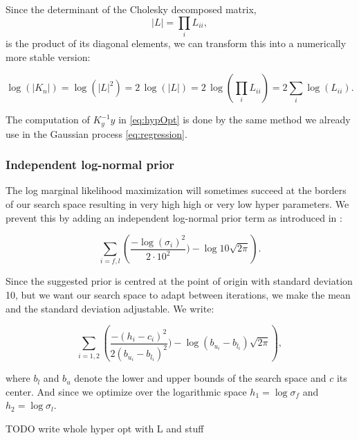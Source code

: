 Since the determinant of the Cholesky decomposed matrix,
$$|L| = \textstyle\prod_{i} L_{ii},$$
is the product of its diagonal elements, we can transform this into a numerically more stable version:

$$\log(|K_n|) = \log(|L|^{2}) = 2\,\log(|L|) = 2\,\log(\textstyle\prod_{i} L_{ii}) = 2\textstyle\sum_{i} \log(L_{ii}).$$

The computation of $K_y^{-1}y$ in \eqref{eq:hypOpt} is done by the same method we already use in the Gaussian process \eqref{eq:regression}.

\subsubsection{Independent log-normal prior}
The log marginal likelihood maximization will sometimes succeed at the borders of our search space resulting in very high high or very low hyper parameters. We prevent this by adding an independent log-normal prior term as introduced in \cite{lizotte2008practical}:

$$\sum_{i=f,l}\left(\frac{-\log(\sigma_i)^2}{2\cdot 10^2}) - \log 10\sqrt{2\pi} \right).$$

Since the suggested prior is centred at the point of origin with standard deviation 10, but we want our search space to adapt between iterations, we make the mean and the standard deviation adjustable. We write:

$$\sum_{i=1,2}\left(\frac{-(h_i-c_i)^2}{2(b_{u_i}-b_{l_i})^2}) - \log(b_{u_i}-b_{l_i})\sqrt{2\pi} \right),$$

where $b_l$ and $b_u$ denote the lower and upper bounds of the search space and $c$ its center. And since we optimize over the logarithmic space $h_1 = \log\sigma_f$ and $h_2 = \log\sigma_l$.


TODO write whole hyper opt with L and stuff
